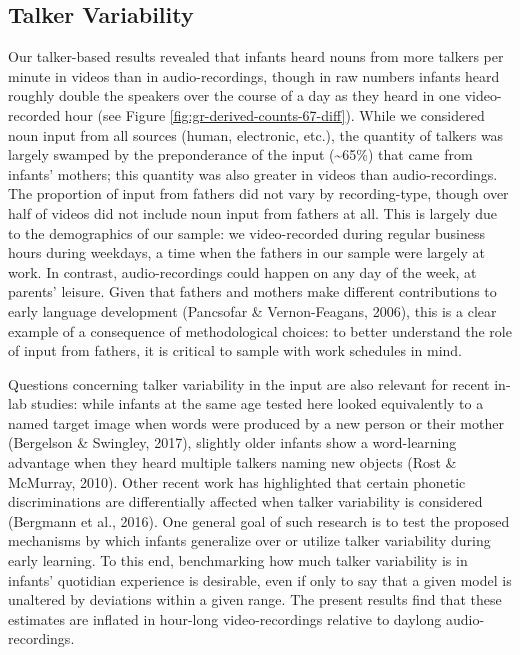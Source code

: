 \documentclass[floatsintext,man]{apa6}
\theoremstyle{definition}
\theoremstyle{definition}
\theoremstyle{definition}
\theoremstyle{remark}
\begin{document}
\hypertarget{talker-variability}{%
\subsection{Talker Variability}\label{talker-variability}}

Our talker-based results revealed that infants heard nouns from more
talkers per minute in videos than in audio-recordings, though in raw
numbers infants heard roughly double the speakers over the course of a
day as they heard in one video-recorded hour (see Figure
\ref{fig:gr-derived-counts-67-diff}). While we considered noun input
from all sources (human, electronic, etc.), the quantity of talkers was
largely swamped by the preponderance of the input
(\textasciitilde{}65\%) that came from infants' mothers; this quantity
was also greater in videos than audio-recordings. The proportion of
input from fathers did not vary by recording-type, though over half of
videos did not include noun input from fathers at all. This is largely
due to the demographics of our sample: we video-recorded during regular
business hours during weekdays, a time when the fathers in our sample
were largely at work. In contrast, audio-recordings could happen on any
day of the week, at parents' leisure. Given that fathers and mothers
make different contributions to early language development (Pancsofar \&
Vernon-Feagans, 2006), this is a clear example of a consequence of
methodological choices: to better understand the role of input from
fathers, it is critical to sample with work schedules in mind.

Questions concerning talker variability in the input are also relevant
for recent in-lab studies: while infants at the same age tested here
looked equivalently to a named target image when words were produced by
a new person or their mother (Bergelson \& Swingley, 2017), slightly
older infants show a word-learning advantage when they heard multiple
talkers naming new objects (Rost \& McMurray, 2010). Other recent work
has highlighted that certain phonetic discriminations are differentially
affected when talker variability is considered (Bergmann et al., 2016).
One general goal of such research is to test the proposed mechanisms by
which infants generalize over or utilize talker variability during early
learning. To this end, benchmarking how much talker variability is in
infants' quotidian experience is desirable, even if only to say that a
given model is unaltered by deviations within a given range. The present
results find that these estimates are inflated in hour-long
video-recordings relative to daylong audio-recordings.
\end{document}
